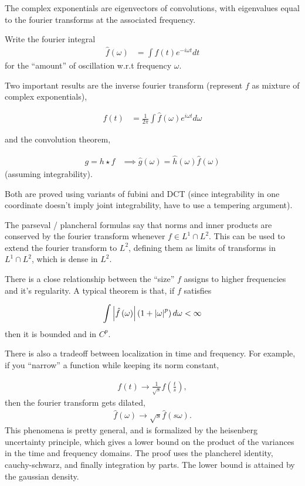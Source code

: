 \documentclass{article}
\begin{document}
The complex exponentials are eigenvectors of convolutions, with eigenvalues
equal to the fourier transforms at the associated frequency.

Write the fourier integral
\begin{align}
\hat{f}\left(\omega\right) &= \int f\left(t\right) e^{-i\omega t} dt
\end{align}
for the ``amount'' of oscillation w.r.t frequency $\omega$.

Two important results are the inverse fourier transform (represent $f$ as
mixture of complex exponentials),

\begin{align}
f\left(t\right) &= \frac{1}{2\pi} \int \hat{f}\left(\omega\right) e^{i\omega t} d\omega
\end{align}

and the convolution theorem,

\begin{align}
g = h \star f &\implies \hat{g}\left(\omega\right) = \hat{h}\left(\omega\right) \hat{f}\left(\omega\right)
\end{align}
(assuming integrability).

Both are proved using variants of fubini and DCT (since integrability in one
coordinate doesn't imply joint integrability, have to use a tempering argument).

The parseval / plancheral formulas say that norms and inner products are
conserved by the fourier transform whenever $f \in L^{1} \cap L^{2}$. This can
be used to extend the fourier transform to $L^{2}$, defining them as limits of
transforms in $L^{1} \cap L^{2}$, which is dense in $L^{2}$.

There is a close relationship between the ``size'' $f$ assigns to higher
frequencies and it's regularity. A typical theorem is that, if $f$ satisfies

\begin{align}
\int \left|\hat{f}\left(\omega\right)\right| \left(1 + \left|\omega\right|^{p}\right) d\omega < \infty
\end{align}
then it is bounded and in $C^{p}$.

There is also a tradeoff between localization in time and frequency. For
example, if you ``narrow'' a function while keeping its norm constant,

\begin{align}
f\left(t\right) \to \frac{1}{\sqrt{s}}f\left(\frac{t}{s}\right),
\end{align}
then the fourier transform gets dilated,
\begin{align}
\hat{f}\left(\omega\right) \to \sqrt{s}\hat{f}\left(s\omega\right).
\end{align}
This phenomena is pretty general, and is formalized by the heisenberg
uncertainty principle, which gives a lower bound on the product of the variances
in the time and frequency domains. The proof uses the plancherel identity,
cauchy-schwarz, and finally integration by parts. The lower bound is attained by
the gaussian density.
\end{document}
